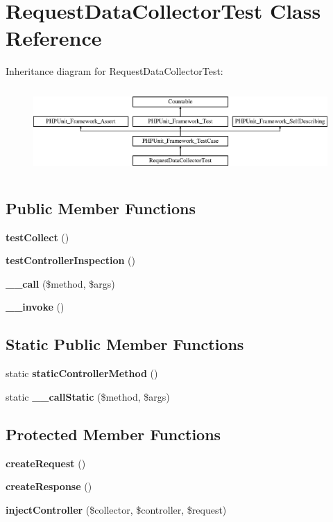 \section{Request\+Data\+Collector\+Test Class Reference}
\label{class_symfony_1_1_component_1_1_http_kernel_1_1_tests_1_1_data_collector_1_1_request_data_collector_test}
Inheritance diagram for Request\+Data\+Collector\+Test\+:\begin{figure}[H]
\begin{center}
\leavevmode
\includegraphics[height=3.303835cm]{class_symfony_1_1_component_1_1_http_kernel_1_1_tests_1_1_data_collector_1_1_request_data_collector_test}
\end{center}
\end{figure}
\subsection*{Public Member Functions}
\begin{DoxyCompactItemize}
\item 
{\bf test\+Collect} ()
\item 
{\bf test\+Controller\+Inspection} ()
\item 
{\bf \+\_\+\+\_\+call} (\$method, \$args)
\item 
{\bf \+\_\+\+\_\+invoke} ()
\end{DoxyCompactItemize}
\subsection*{Static Public Member Functions}
\begin{DoxyCompactItemize}
\item 
static {\bf static\+Controller\+Method} ()
\item 
static {\bf \+\_\+\+\_\+call\+Static} (\$method, \$args)
\end{DoxyCompactItemize}
\subsection*{Protected Member Functions}
\begin{DoxyCompactItemize}
\item 
{\bf create\+Request} ()
\item 
{\bf create\+Response} ()
\item 
{\bf inject\+Controller} (\$collector, \$controller, \$request)
\end{DoxyCompactItemize}
